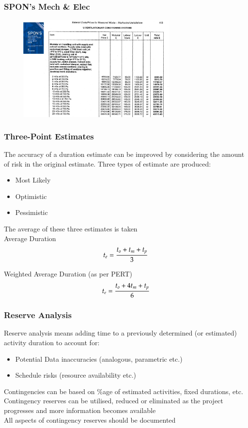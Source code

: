 \begin{frame}
\frametitle{SPON's Mech \& Elec}
\begin{figure}
	\centering
		\includegraphics[width = 8cm]{images/Spon2.jpg}
	\label{fig:Spon2}
\end{figure}

\end{frame}




\begin{frame}
\frametitle{Three-Point Estimates}
The accuracy of a duration estimate can be improved by considering the amount of risk in the original estimate.  Three types of estimate are produced:
\begin{itemize}
	\item Most Likely
	\item Optimistic
	\item Pessimistic
\end{itemize}
The average of these three estimates is taken\\

Average Duration
\begin{equation}
t_e = \frac{t_o + t_m + t_p}{3} \label{eqn:procaverage}	\notag
\end{equation}

Weighted Average Duration (as per PERT)
\begin{equation}
t_e = \frac{t_o + 4t_m + t_p}{6} \label{eqn:procwpaverage}	\notag
\end{equation}
\end{frame}




\begin{frame}
\frametitle{Reserve Analysis}
Reserve analysis means adding time to a previously determined (or estimated) activity duration to account for:
\begin{itemize}
	\item Potential Data inaccuracies (analogous, parametric etc.) 
	\item Schedule risks (resource availability etc.)
\end{itemize}
Contingencies can be based on \%age of estimated activities, fixed durations, etc.\\
Contingency reserves can be utilised, reduced or eliminated as the project progresses and more information becomes available\\
All aspects of contingency reserves should be documented\\
\end{frame}




